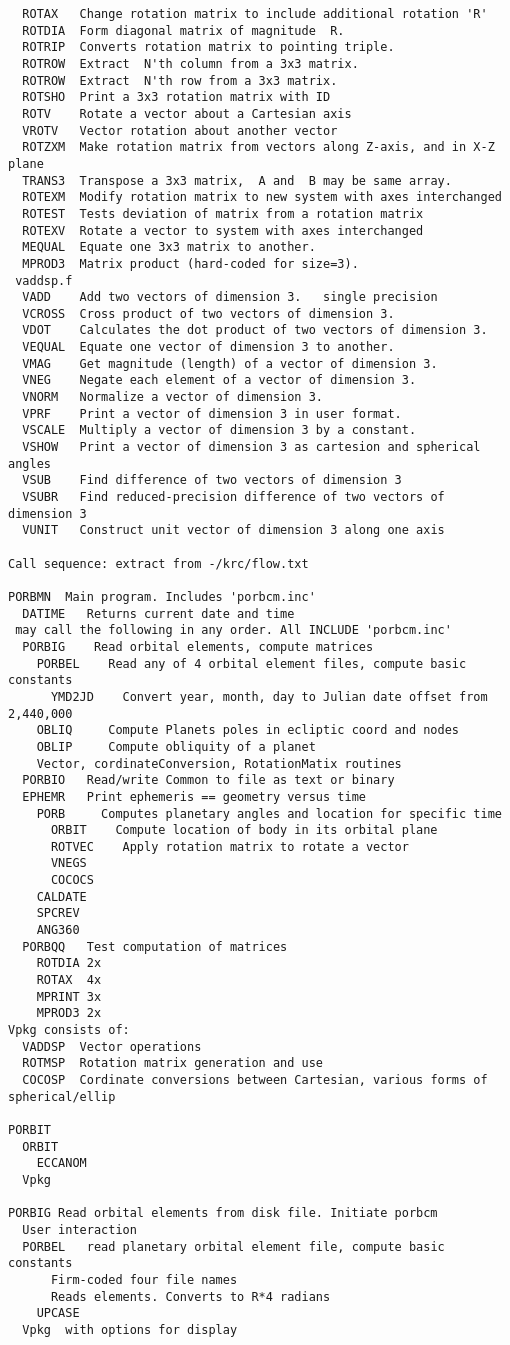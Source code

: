 \documentclass[draft]{article}
\begin{document}
\begin{verbatim}
  ROTAX   Change rotation matrix to include additional rotation 'R'
  ROTDIA  Form diagonal matrix of magnitude  R.
  ROTRIP  Converts rotation matrix to pointing triple.
  ROTROW  Extract  N'th column from a 3x3 matrix.
  ROTROW  Extract  N'th row from a 3x3 matrix.
  ROTSHO  Print a 3x3 rotation matrix with ID
  ROTV    Rotate a vector about a Cartesian axis
  VROTV   Vector rotation about another vector
  ROTZXM  Make rotation matrix from vectors along Z-axis, and in X-Z plane
  TRANS3  Transpose a 3x3 matrix,  A and  B may be same array.
  ROTEXM  Modify rotation matrix to new system with axes interchanged
  ROTEST  Tests deviation of matrix from a rotation matrix
  ROTEXV  Rotate a vector to system with axes interchanged
  MEQUAL  Equate one 3x3 matrix to another.
  MPROD3  Matrix product (hard-coded for size=3).
 vaddsp.f
  VADD    Add two vectors of dimension 3.   single precision
  VCROSS  Cross product of two vectors of dimension 3.
  VDOT    Calculates the dot product of two vectors of dimension 3.
  VEQUAL  Equate one vector of dimension 3 to another.
  VMAG    Get magnitude (length) of a vector of dimension 3.
  VNEG    Negate each element of a vector of dimension 3.
  VNORM   Normalize a vector of dimension 3.
  VPRF    Print a vector of dimension 3 in user format.
  VSCALE  Multiply a vector of dimension 3 by a constant.
  VSHOW   Print a vector of dimension 3 as cartesion and spherical angles
  VSUB    Find difference of two vectors of dimension 3
  VSUBR   Find reduced-precision difference of two vectors of dimension 3
  VUNIT   Construct unit vector of dimension 3 along one axis 

Call sequence: extract from -/krc/flow.txt

PORBMN  Main program. Includes 'porbcm.inc'
  DATIME   Returns current date and time
 may call the following in any order. All INCLUDE 'porbcm.inc'
  PORBIG    Read orbital elements, compute matrices
    PORBEL    Read any of 4 orbital element files, compute basic constants
      YMD2JD    Convert year, month, day to Julian date offset from 2,440,000
    OBLIQ     Compute Planets poles in ecliptic coord and nodes
    OBLIP     Compute obliquity of a planet  
    Vector, cordinateConversion, RotationMatix routines
  PORBIO   Read/write Common to file as text or binary
  EPHEMR   Print ephemeris == geometry versus time
    PORB     Computes planetary angles and location for specific time
      ORBIT    Compute location of body in its orbital plane
      ROTVEC    Apply rotation matrix to rotate a vector
      VNEGS
      COCOCS
    CALDATE
    SPCREV
    ANG360
  PORBQQ   Test computation of matrices
    ROTDIA 2x
    ROTAX  4x
    MPRINT 3x
    MPROD3 2x 
Vpkg consists of:
  VADDSP  Vector operations
  ROTMSP  Rotation matrix generation and use
  COCOSP  Cordinate conversions between Cartesian, various forms of spherical/ellip

PORBIT
  ORBIT
    ECCANOM
  Vpkg

PORBIG Read orbital elements from disk file. Initiate porbcm
  User interaction
  PORBEL   read planetary orbital element file, compute basic constants
      Firm-coded four file names
      Reads elements. Converts to R*4 radians
    UPCASE
  Vpkg  with options for display
\end{verbatim}
\end{document}
